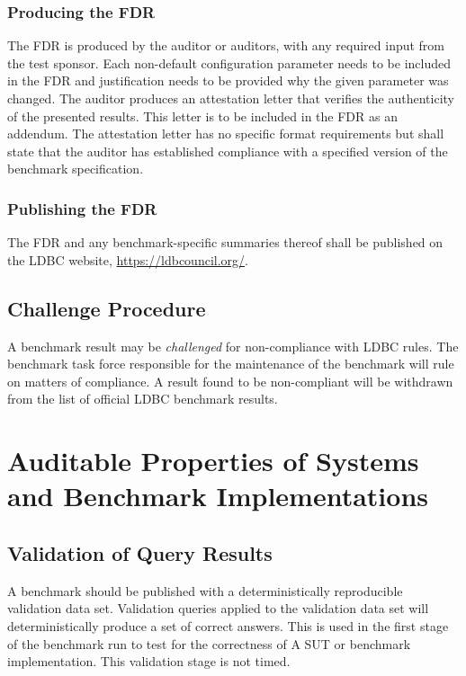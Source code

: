 \subsubsection{Producing the FDR}
The FDR is produced by the auditor or auditors, with any required input from the test sponsor. Each non-default configuration parameter needs to be included in the FDR and justification needs to be provided why the given parameter was changed.
The auditor produces an attestation letter that verifies the authenticity of the presented results. This letter is to be included in the FDR as an addendum. The attestation letter has no specific format requirements but shall state that the auditor has established compliance with a specified version of the benchmark specification.

\subsubsection{Publishing the FDR}
The FDR and any benchmark-specific summaries thereof shall be published on the LDBC website, \url{https://ldbcouncil.org/}.

\subsection{Challenge Procedure}

A benchmark result may be \emph{challenged} for non-compliance with LDBC rules. The benchmark task force responsible for the maintenance of the benchmark will rule on matters of compliance. A result found to be non-compliant will be withdrawn from the list of official LDBC benchmark results.




\section{Auditable Properties of Systems and Benchmark Implementations}

\subsection{Validation of Query Results}
\label{sec:validation}
A benchmark should be published with a deterministically reproducible validation data set. Validation queries applied to the validation data set will deterministically produce a set of correct answers. This is used in the first stage of the benchmark run to test for the correctness of A SUT or benchmark implementation. This validation stage is not timed.

